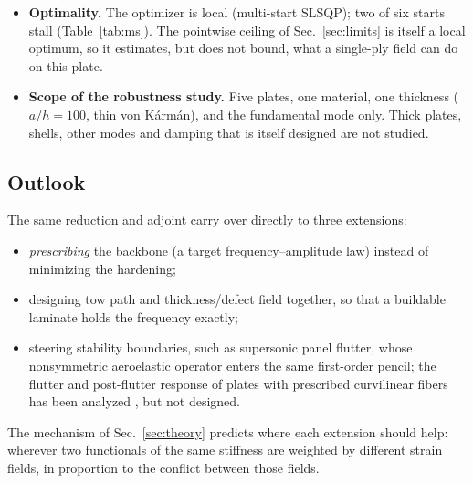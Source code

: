 \begin{itemize}[itemsep=2pt]
  Proposition~\ref{prop:ssmcond} bounds the error by $4\omega_1^2/\omega_{\mathrm{in}}^2=\nRhoIn$, and
  the full SSM, which retains in-plane inertia, agrees to $\nSSMvsEval\%$.
\item \textbf{Optimality.} The optimizer is local (multi-start SLSQP); two of six starts stall
  (Table~\ref{tab:ms}). The pointwise ceiling of Sec.~\ref{sec:limits} is itself a local optimum, so it
  estimates, but does not bound, what a single-ply field can do on this plate.
\item \textbf{Scope of the robustness study.} Five plates, one material, one thickness ($a/h=100$, thin
  von K\'arm\'an), and the fundamental mode only. Thick plates, shells, other modes and damping that is
  itself designed are not studied.
\end{itemize}

\subsection{Outlook}
The same reduction and adjoint carry over directly to three extensions:
\begin{itemize}[itemsep=1pt]
\item \emph{prescribing} the backbone (a target frequency--amplitude law) instead of
  minimizing the hardening;
\item designing tow path and thickness/defect field together, so that a buildable laminate holds the
  frequency exactly;
\item steering stability boundaries, such as supersonic panel flutter, whose
  nonsymmetric aeroelastic operator enters the same first-order pencil; the flutter and
  post-flutter response of plates with prescribed curvilinear fibers has been analyzed
  \cite{akhavan2018,akhavan2020,farsadi2019}, but not designed.
\end{itemize}
The mechanism of Sec.~\ref{sec:theory} predicts where each extension should help: wherever
two functionals of the same stiffness are weighted by different strain fields, in proportion to
the conflict between those fields.

